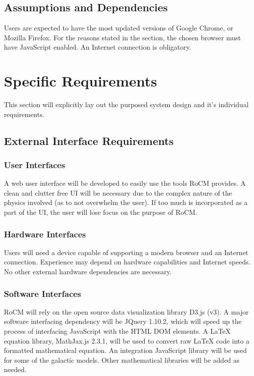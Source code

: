 \documentclass[titlepage]{article}
\begin{document}
\subsection{Assumptions and Dependencies}
Users are expected to have the most updated versions of Google Chrome, or Mozilla Firefox. For the reasons stated in the  section, the chosen browser must have JavaScript enabled. An Internet connection is obligatory.

\section{Specific Requirements}
\label{Specific Requirements}
This section will explicitly lay out the purposed system design and it's individual requirements.

\subsection{External Interface Requirements}
\subsubsection{User Interfaces}
A web user interface will be developed to easily use the tools RoCM provides. A clean and clutter free UI will be necessary due to the complex nature of the physics involved (as to not overwhelm the user). If too much is incorporated as a part of the UI, the user will lose focus on the purpose of RoCM.

\subsubsection{Hardware Interfaces}
Users will need a device capable of supporting a modern browser and an Internet connection. Experience may depend on hardware capabilities and Internet speeds. No other external hardware dependencies are necessary.

\subsubsection{Software Interfaces}
RoCM will rely on the open source data visualization library D3.js (v3). A major software interfacing dependency will be JQuery 1.10.2, which will speed up the process of interfacing JavaScript with the HTML DOM elements. A LaTeX equation library, MathJax.js 2.3.1, will be used to convert raw LaTeX code into a formatted mathematical equation. An integration JavaScript library will be used for some of the galactic models. Other mathematical libraries will be added as needed.
\end{document}
